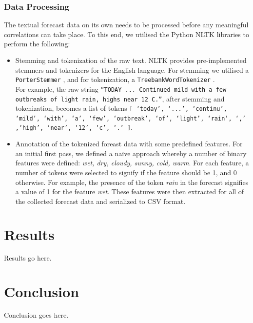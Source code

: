 \documentclass[a4paper,10pt]{article}
\begin{document}
\subsubsection{Data Processing}

The textual forecast data on its own needs to be processed before any meaningful correlations can take place. To this end, we utilised the Python NLTK libraries to perform the following:
\begin{itemize}
    \item{
        Stemming and tokenization of the raw text. NLTK provides pre-implemented stemmers and tokenizers for the English language. For stemming we utilised a \texttt{PorterStemmer} , and for tokenization, a \texttt{TreebankWordTokenizer} . \\ 
        For example, the raw string \texttt{``TODAY ... Continued mild with a few outbreaks of light rain, highs near 12 C.''}, after stemming and tokenization, becomes a list of tokens \texttt{[ `today', `...', `continu', `mild', `with', `a', `few', `outbreak', `of', `light', `rain', `,' ,`high', `near', `12', `c', `.' ]}.
    }
    \item{
        Annotation of the tokenized foreast data with some predefined features. For an initial first pass, we defined a na\"{i}ve approach whereby a number of binary features were defined: \textit{wet, dry, cloudy, sunny, cold, warm}. For each feature, a number of tokens were selected to signify if the feature should be 1, and 0 otherwise. For example, the presence of the token \textit{rain} in the forecast signifies a value of 1 for the feature \textit{wet}. These features were then extracted for all of the collected forecast data and serialized to CSV format.
    }
\end{itemize}

\section{Results}

Results go here.

\section{Conclusion}

Conclusion goes here.
\end{document}
